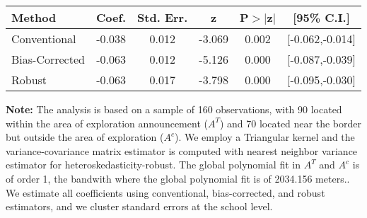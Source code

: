 \begin{table}[htbp]\centering
 \footnotesize 
\begin{tabular}{lccccc}
\hline\hline
Method & Coef. & Std. Err. & z & P$>|$z$|$ & [95\% C.I.] \\ 
\hline \hline  
Conventional & -0.038 & 0.012 & -3.069 & 0.002 & [-0.062,-0.014] \\ 
 Bias-Corrected & -0.063 & 0.012 & -5.126 & 0.000 & [-0.087,-0.039] \\ 
Robust & -0.063 & 0.017 & -3.798 & 0.000 & [-0.095,-0.030] \\ 
  \hline\hline
\end{tabular}
\label{table:rd}
\begin{tablenotes} 
  \justifying \tiny \textbf{Note: }    
   The analysis is based on a sample of 160 observations, with 90 located within the area of exploration announcement ($A^{T}$) and 70 located near the border but outside the area of exploration  ($A^{c}$). 
           We employ a Triangular kernel and the variance-covariance matrix estimator is computed with nearest neighbor variance estimator for heteroskedasticity-robust. The global polynomial fit in  $A^{T}$ and $A^{c}$ is of order 1, the bandwith where the global polynomial fit is of 2034.156 meters.. We estimate all coefficients using conventional, bias-corrected, and robust estimators, and we cluster standard errors at the school level. \end{tablenotes} 
 \end{table} 
